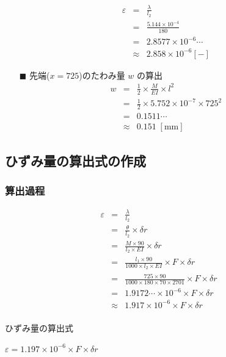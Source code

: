 \documentclass[twocolumn,a4j]{jsarticle}
\begin{document}
\begin{itemize}
          \begin{eqnarray*}
              \varepsilon &=& \frac{\lambda}{l_2}\\
              &=& \frac{5.144 × 10^{-4}}{180}\\
              &=& 2.8577 ×　10^{-6}\cdots\\
              &\approx& 2.858 × 10^{-6} \left[\mathrm{-}\right]
          \end{eqnarray*}
    \item [$\blacksquare$] 先端($x=725$)のたわみ量 $w$ の算出
          \begin{eqnarray*}
              w &=& \frac{1}{2} × \frac{M}{EI} × l^2\\
              &=& \frac{1}{2} × 5.752 × 10^{-7} × 725^2\\
              &=& 0.1511 \cdots\\
              &\approx& 0.151 \;\left[\mathrm{mm}\right]
          \end{eqnarray*}
\end{itemize}

\subsection{ひずみ量の算出式の作成}

\subsubsection{算出過程}
\begin{eqnarray*}
    \varepsilon &=& \frac{\lambda}{l_2}\\
    &=& \frac{\theta}{l_2} × \delta r\\
    &=& \frac{M × 90}{l_2 × EI} × \delta r\\
    &=& \frac{l_1 × 90}{1000 × l_2 × EI} × F × \delta r\\
    &=& \frac{725 × 90}{1000 × 180 × 70 × 2701} × F × \delta r\\
    &=& 1.9172 \cdots × 10^{-6} × F × \delta r\\
    &\approx& 1.917 × 10^{-6} × F × \delta r\\
\end{eqnarray*}

\begin{itembox}[l]{ひずみ量の算出式}
    \begin{center}
        $\displaystyle \varepsilon = 1.197 × 10^{-6} × F × \delta r$
    \end{center}
\end{itembox}
\end{document}
